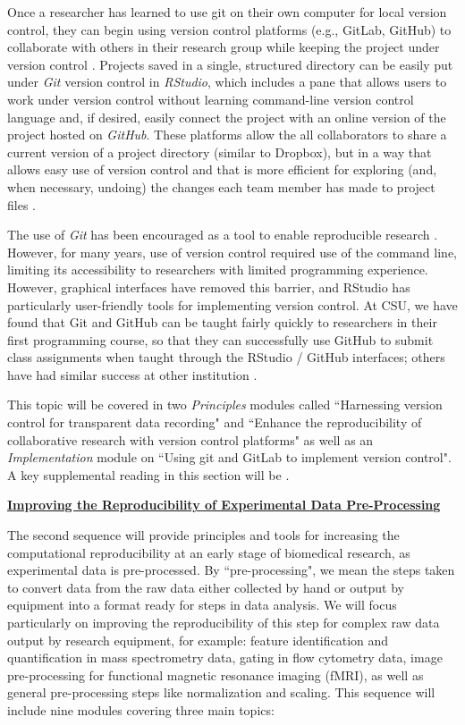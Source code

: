 \documentclass[pdftex,english,11pt,parskip=half]{scrartcl}
\begin{document}
Once a researcher has learned to use git on their own computer for local version control, they can begin using version control 
platforms (e.g., GitLab, GitHub) to collaborate with others in their research
group while keeping the project under version control \cite{bryan2018excuse, shade2015computing}. Projects saved in a single, structured directory
can be easily put under \textit{Git} version control in \textit{RStudio}, which
includes a pane that allows users to work under version control without learning
command-line version control language and, if desired, easily connect the
project with an online version of the project hosted on \textit{GitHub}. These platforms allow
the all collaborators to share a current version of a project directory 
(similar to Dropbox), but in a way that allows easy use of version control 
and that is more efficient for exploring (and, when necessary, undoing) the changes 
each team member has made to project files \cite{bryan2018excuse}. 

The use of \textit{Git} has been encouraged as a tool to enable reproducible research \cite{piccolo2016tools, ram2013git, bryan2018excuse, lowndes2017our, cetinkaya2017infrastructure}. However, for many years, use of version control required use of the command line,
limiting its accessibility to researchers with limited programming experience.
However, graphical interfaces have removed this barrier, and RStudio has 
particularly user-friendly tools for implementing version control. At CSU, we have found that Git and GitHub can be taught fairly quickly to researchers in their first programming course, so that they can successfully use GitHub to submit class assignments when taught through the RStudio / GitHub interfaces; others have had similar success at other institution \cite{bryan2018excuse}.

This
topic will be covered in two \textit{Principles} modules called ``Harnessing
version control for transparent data recording" and ``Enhance the
reproducibility of collaborative research with version control platforms" as
well as an \textit{Implementation} module on ``Using git and GitLab to implement
version control". A key supplemental reading in this section will be \cite{bryan2018excuse}.

\underline{\textbf{Improving the Reproducibility of Experimental Data
Pre-Processing}}

The second sequence will provide principles and tools for increasing the
computational reproducibility at an early stage of biomedical research, as
experimental data is pre-processed. By ``pre-processing", we mean the steps 
taken to convert data from the raw data either collected by hand or output
by equipment into a format ready for steps in data analysis. We will focus
particularly on improving the reproducibility of this step for complex 
raw data output by research equipment, for example: feature identification 
and quantification in mass spectrometry data, gating in flow cytometry data, 
image pre-processing for functional magnetic resonance imaging (fMRI), as well
as general pre-processing steps like normalization and scaling. This sequence will include nine modules covering three main topics: 
\end{document}
